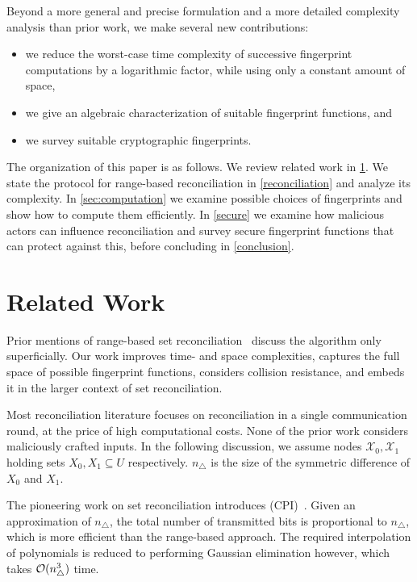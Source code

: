 \documentclass[conference]{IEEEtran}
\begin{document}
Beyond a more general and precise formulation and a more detailed complexity analysis than prior work, we make several new contributions:

\begin{itemize}
    \item we reduce the worst-case time complexity of successive fingerprint computations by a logarithmic factor, while using only a constant amount of space,
    \item we give an algebraic characterization of suitable fingerprint functions, and
    \item we survey suitable cryptographic fingerprints.
\end{itemize}

The organization of this paper is as follows. We review related work in \cref{related-work}. We state the protocol for range-based reconciliation in \cref{reconciliation} and analyze its complexity. In \cref{sec:computation} we examine possible choices of fingerprints and show how to compute them efficiently. In \cref{secure} we examine how malicious actors can influence reconciliation and survey secure fingerprint functions that can protect against this, before concluding in \cref{conclusion}.

\section{Related Work}\label{related-work}

Prior mentions of range-based set reconciliation~\cite{chen1999prototype}\cite{shang2017survey} discuss the algorithm only superficially. Our work improves time- and space complexities, captures the full space of possible fingerprint functions, considers collision resistance, and embeds it in the larger context of set reconciliation.

Most reconciliation literature focuses on reconciliation in a single communication round, at the price of high computational costs. None of the prior work considers maliciously crafted inputs. In the following discussion, we assume nodes $\mathcal{X}_0, \mathcal{X}_1$ holding sets $X_0, X_1 \subseteq U$ respectively. $n_{\triangle}$ is the size of the symmetric difference of $X_0$ and $X_1$.

The pioneering work on set reconciliation introduces  (CPI)~\cite{minsky2003set}. Given an approximation of $n_{\triangle}$, the total number of transmitted bits is proportional to $n_{\triangle}$, which is more efficient than the range-based approach. The required interpolation of polynomials is reduced to performing Gaussian elimination however, which takes $\mathcal{O}(n_{\triangle}^3)$ time.
\end{document}
